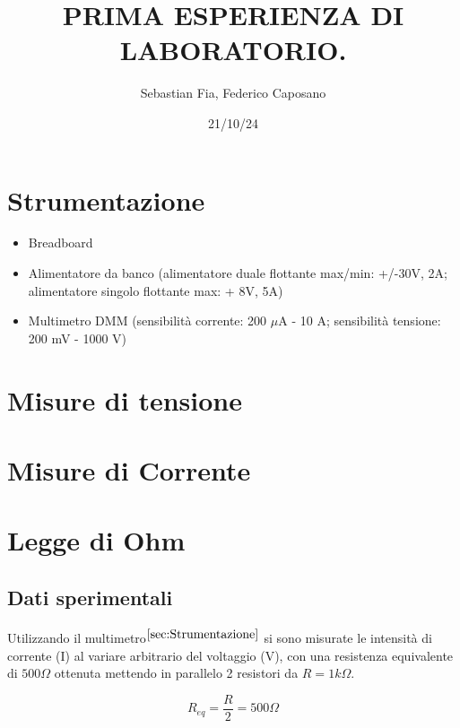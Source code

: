 \documentclass{article}
\title{PRIMA ESPERIENZA DI LABORATORIO.
}
\author{Sebastian Fia, Federico Caposano}
\date{21/10/24}
\begin{document}
	
	\maketitle   %
	
	\section{Strumentazione} \label{sec:Strumentazione}
	 	\begin{itemize} 
	 		\item Breadboard
	 		\item Alimentatore da banco (alimentatore duale flottante max/min: +/-30V, 2A; alimentatore singolo flottante max: + 8V, 5A)
	 		\item Multimetro DMM (sensibilità corrente: 200 $\mu$A - 10 A; sensibilità tensione: 200 mV - 1000 V)
	 	
	 	\end{itemize}
	
	\section{Misure di tensione} \label{sec:Tensione}
	\section{Misure di Corrente} \label{sec:Corrente}
	
	
	
	\section{Legge di Ohm} \label{sec:Ohm}
		\subsection{Dati sperimentali}
			\paragraph{}
				Utilizzando il multimetro$^{\ref{sec:Strumentazione}}$ si sono misurate le intensità di corrente (I) al variare arbitrario del voltaggio (V), con una resistenza equivalente di $500\Omega$ ottenuta mettendo in parallelo 2 resistori da $R=1k\Omega$.
				\begin{center}
					\begin{equation}
						R_{eq} = \frac{R}{2} = 500\Omega
					\end{equation}
				\end{center}
				
\end{document}
